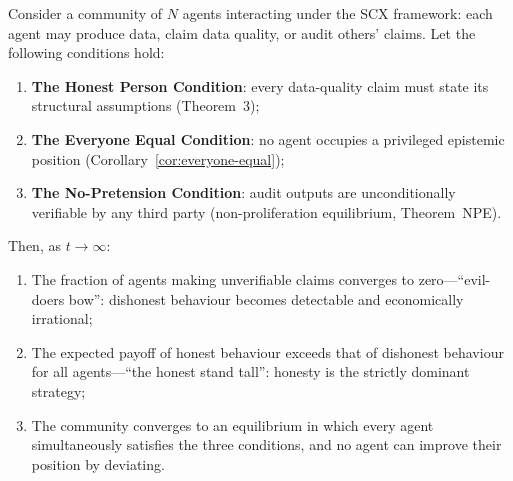 \begin{conjecture}
\label{conj:good-convergence}
Consider a community of $N$ agents interacting under the SCX framework:
each agent may produce data, claim data quality, or audit others' claims.
Let the following conditions hold:
\begin{enumerate}[label=(C\arabic*)]
  \item \textbf{The Honest Person Condition}: every data-quality claim must state its
    structural assumptions (Theorem~3);
  \item \textbf{The Everyone Equal Condition}: no agent occupies a privileged epistemic
    position (Corollary~\ref{cor:everyone-equal});
  \item \textbf{The No-Pretension Condition}: audit outputs are unconditionally verifiable
    by any third party (non-proliferation equilibrium, Theorem~NPE).
\end{enumerate}
Then, as $t\to\infty$:
\begin{enumerate}[label=(\roman*)]
  \item The fraction of agents making unverifiable claims converges to
    zero---``evil-doers bow'': dishonest behaviour becomes detectable and
    economically irrational;
  \item The expected payoff of honest behaviour exceeds that of dishonest
    behaviour for all agents---``the honest stand tall'': honesty is the strictly
    dominant strategy;
  \item The community converges to an equilibrium in which every agent
    simultaneously satisfies the three conditions, and no agent can improve
    their position by deviating.
\end{enumerate}
\end{conjecture}

